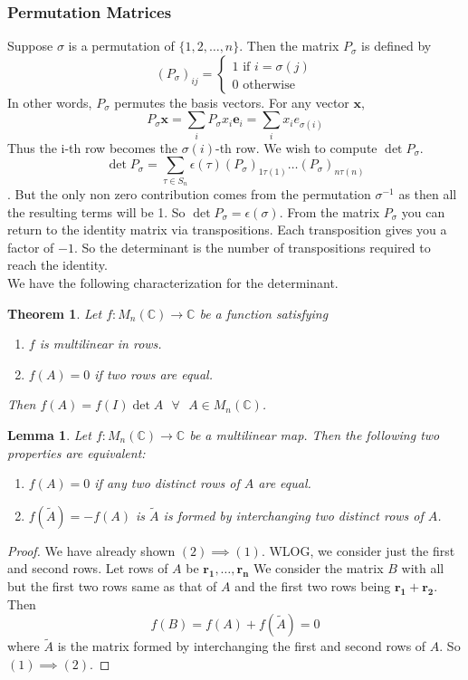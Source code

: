 \documentclass{article}
\newtheorem{theorem}{Theorem}
\newtheorem{lemma}{Lemma}
\begin{document}
\subsubsection*{Permutation Matrices}
Suppose $\sigma$ is a permutation of $\{1,2,\dots,n\}$. Then the matrix $P_{\sigma}$ is defined by
$$(P_{\sigma})_{ij}=
\begin{cases}
1 \text{ if } i=\sigma(j)\\
0 \text{ otherwise}
\end{cases}
$$
In other words, $P_{\sigma}$ permutes the basis vectors. For any vector $\mathbf{x}$,
$$P_{\sigma}\mathbf{x}=\sum_{i}P_{\sigma}x_{i}\mathbf{e}_i=\sum_{i}x_{i}e_{\sigma(i)}$$
Thus the i-th row becomes the $\sigma(i)$-th row. We wish to compute $\det{P_{\sigma}}$.
$$\det{P_{\sigma}}=\sum_{\tau\in S_n}\epsilon(\tau)(P_{\sigma})_{1\tau(1)}\dots(P_{\sigma})_{n\tau(n)}$$.
But the only non zero contribution comes from the permutation $\sigma^{-1}$ as then all the resulting terms will be 1. So $\det{P_{\sigma}}=\epsilon(\sigma)$.
From the matrix $P_{\sigma}$ you can return to the identity matrix via transpositions. Each transposition gives you a factor of $-1$. So the determinant is the number of transpositions required to reach the identity.
\\ We have the following characterization for the determinant.
\begin{theorem}
    Let $f:M_{n}(\mathbb{C})\to \mathbb{C}$ be a function satisfying
    \begin{enumerate}
        \item $f$ is multilinear in rows.
        \item $f(A)=0$ if two rows are equal. 
    \end{enumerate}
    Then $f(A)=f(I)\det{A}\text{ }\forall\text{ }A\in M_{n}(\mathbb{C})$.
\end{theorem}
\begin{lemma}
    Let $f:M_{n}(\mathbb{C})\to \mathbb{C}$ be a multilinear map. Then the following two properties are equivalent:
    \begin{enumerate}
        \item $f(A)=0$ if any two distinct rows of $A$ are equal.
        \item $f(\tilde{A})=-f(A)$ is $\tilde{A}$ is formed by interchanging two distinct rows of $A$.
    \end{enumerate}
\end{lemma}
\begin{proof}
    We have already shown $(2)\implies (1)$. WLOG, we consider just the first and second rows. Let rows of $A$ be $\mathbf{r_1},\dots,\mathbf{r_n}$
    We consider the matrix $B$ with all but the first two rows same as that of $A$ and the first two rows being $\mathbf{r_1}+\mathbf{r_2}$.
    Then 
    $$f(B)=f(A)+f(\tilde{A})=0$$
    where $\tilde{A}$ is the matrix formed by interchanging the first and second rows of $A$. So $(1)\implies (2)$.
\end{proof}
\end{document}
